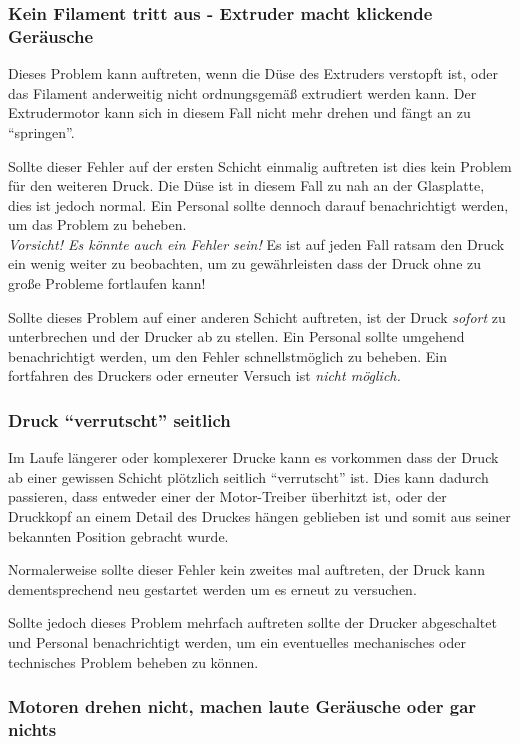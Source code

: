\subsubsection[Kein Filamentaustritt]{Kein Filament tritt aus - Extruder macht klickende Geräusche}

Dieses Problem kann auftreten, wenn die Düse des Extruders verstopft ist, oder das Filament anderweitig nicht ordnungsgemäß extrudiert werden kann. Der Extrudermotor kann sich in diesem Fall nicht mehr drehen und fängt an zu "`springen"'.

Sollte dieser Fehler auf der ersten Schicht einmalig auftreten ist dies kein Problem für den weiteren Druck. Die Düse ist in diesem Fall zu nah an der Glasplatte, dies ist jedoch normal. 
Ein Personal sollte dennoch darauf benachrichtigt werden, um das Problem zu beheben. \\
\emph{Vorsicht! Es könnte auch ein Fehler sein!} Es ist auf jeden Fall ratsam den Druck ein wenig weiter zu beobachten, um zu gewährleisten dass der Druck ohne zu große Probleme fortlaufen kann!

Sollte dieses Problem auf einer anderen Schicht auftreten, ist der Druck \emph{sofort} zu unterbrechen und der Drucker ab zu stellen. Ein Personal sollte umgehend benachrichtigt werden, um den Fehler schnellstmöglich zu beheben. Ein fortfahren des Druckers oder erneuter Versuch ist \emph{nicht möglich.}

\subsubsection{Druck "`verrutscht"' seitlich}

Im Laufe längerer oder komplexerer Drucke kann es vorkommen dass der Druck ab einer gewissen Schicht plötzlich seitlich "`verrutscht"' ist. Dies kann dadurch passieren, dass entweder einer der Motor-Treiber überhitzt ist, oder der Druckkopf an einem Detail des Druckes hängen geblieben ist und somit aus seiner bekannten Position gebracht wurde.

Normalerweise sollte dieser Fehler kein zweites mal auftreten, der Druck kann dementsprechend neu gestartet werden um es erneut zu versuchen.

Sollte jedoch dieses Problem mehrfach auftreten sollte der Drucker abgeschaltet und Personal benachrichtigt werden, um ein eventuelles mechanisches oder technisches Problem beheben zu können.

\subsubsection{Motoren drehen nicht, machen laute Geräusche oder gar nichts}

